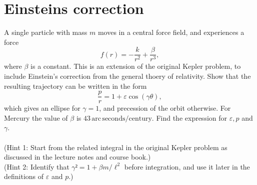 \documentclass{article}
\begin{document}
    \section{Einsteins correction}
        A single particle with mass $m$ moves in a central force field, and experiences a force 
        \begin{equation*}
            f(r) = -\frac{k}{r^2} + \frac{\beta}{r^3},
        \end{equation*}
        where $\beta$ is a constant. This is an extension of the original Kepler problem, to include Einstein's correction from the general thoery of relativity. Show that the resulting trajectory can be written in the form 
        \begin{equation*}
            \frac{p}{r} = 1 + \varepsilon \cos(\gamma \theta),
        \end{equation*}
        which gives an ellipse for $\gamma = 1$, and precession of the orbit otherwise. For Mercury the value of $\beta$ is $43 \, \mathrm{arc}\, \mathrm{seconds}/\mathrm{century}$. Find the expression for $\varepsilon, p$ and $\gamma$. \\ \\
        (Hint 1: Start from the related integral in the original Kepler problem as discussed in the lecture notes and course book.) \\
        (Hint 2: Identify that $\gamma² = 1 + \beta m / \ell^2$ before integration, and use it later in the definitions of $\varepsilon$ and $p$.)
\end{document}
